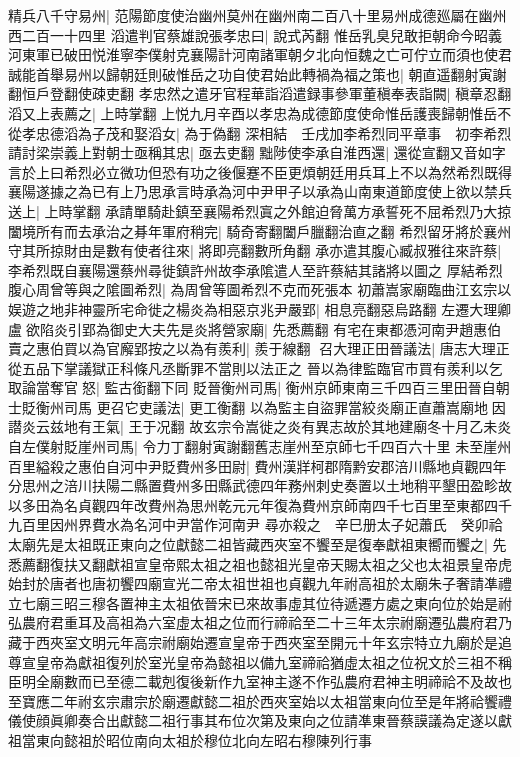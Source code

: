 精兵八千守易州|{
	范陽節度使治幽州莫州在幽州南二百八十里易州成德廵屬在幽州西二百一十四里}
滔遣判官蔡雄說張孝忠曰|{
	說式芮翻}
惟岳乳臭兒敢拒朝命今昭義河東軍已破田悦淮寧李僕射克襄陽計河南諸軍朝夕北向恒魏之亡可佇立而須也使君誠能首舉易州以歸朝廷則破惟岳之功自使君始此轉禍為福之策也|{
	朝直遥翻射寅謝翻恒戶登翻使疎吏翻}
孝忠然之遣牙官程華詣滔遣録事參軍董稹奉表詣闕|{
	稹章忍翻}
滔又上表薦之|{
	上時掌翻}
上悦九月辛酉以孝忠為成德節度使命惟岳護喪歸朝惟岳不從孝忠德滔為子茂和娶滔女|{
	為于偽翻}
深相結　壬戌加李希烈同平章事　初李希烈請討梁崇義上對朝士亟稱其忠|{
	亟去吏翻}
黜陟使李承自淮西還|{
	還從宣翻又音如字}
言於上曰希烈必立微功但恐有功之後偃蹇不臣更煩朝廷用兵耳上不以為然希烈既得襄陽遂據之為已有上乃思承言時承為河中尹甲子以承為山南東道節度使上欲以禁兵送上|{
	上時掌翻}
承請單騎赴鎮至襄陽希烈寘之外館迫脅萬方承誓死不屈希烈乃大掠闔境所有而去承治之朞年軍府稍完|{
	騎奇寄翻闔戶臘翻治直之翻}
希烈留牙將於襄州守其所掠財由是數有使者往來|{
	將即亮翻數所角翻}
承亦遣其腹心臧叔雅往來許蔡|{
	李希烈既自襄陽還蔡州尋徙鎮許州故李承隂遣人至許蔡結其諸將以圖之}
厚結希烈腹心周曾等與之隂圖希烈|{
	為周曾等圖希烈不克而死張本}
初蕭嵩家廟臨曲江玄宗以娱遊之地非神靈所宅命徙之楊炎為相惡京兆尹嚴郢|{
	相息亮翻惡烏路翻}
左遷大理卿盧欲陷炎引郢為御史大夫先是炎將營家廟|{
	先悉薦翻}
有宅在東都憑河南尹趙惠伯賣之惠伯買以為官廨郢按之以為有羨利|{
	羨于線翻}
召大理正田晉議法|{
	唐志大理正從五品下掌議獄正科條凡丞斷罪不當則以法正之}
晉以為律監臨官市買有羨利以乞取論當奪官怒|{
	監古銜翻下同}
貶晉衡州司馬|{
	衡州京師東南三千四百三里田晉自朝士貶衡州司馬}
更召它吏議法|{
	更工衡翻}
以為監主自盜罪當絞炎廟正直蕭嵩廟地因譛炎云兹地有王氣|{
	王于况翻}
故玄宗令嵩徙之炎有異志故於其地建廟冬十月乙未炎自左僕射貶崖州司馬|{
	令力丁翻射寅謝翻舊志崖州至京師七千四百六十里}
未至崖州百里縊殺之惠伯自河中尹貶費州多田尉|{
	費州漢牂柯郡隋黔安郡涪川縣地貞觀四年分思州之涪川扶陽二縣置費州多田縣武德四年務州刺史奏置以土地稍平墾田盈畛故以多田為名貞觀四年改費州為思州乾元元年復為費州京師南四千七百里至東都四千九百里因州界費水為名河中尹當作河南尹}
尋亦殺之　辛巳册太子妃蕭氏　癸卯祫太廟先是太祖既正東向之位獻懿二祖皆藏西夾室不饗至是復奉獻祖東嚮而饗之|{
	先悉薦翻復扶又翻獻祖宣皇帝熙太祖之祖也懿祖光皇帝天賜太祖之父也太祖景皇帝虎始封於唐者也唐初饗四廟宣光二帝太祖世祖也貞觀九年祔高祖於太廟朱子奢請凖禮立七廟三昭三穆各置神主太祖依晉宋已來故事虛其位待遞遷方處之東向位於始是祔弘農府君重耳及高祖為六室虛太祖之位而行禘祫至二十三年太宗祔廟遷弘農府君乃藏于西夾室文明元年高宗祔廟始遷宣皇帝于西夾室至開元十年玄宗特立九廟於是追尊宣皇帝為獻祖復列於室光皇帝為懿祖以備九室禘祫猶虛太祖之位祝文於三祖不稱臣明全廟數而已至德二載剋復後新作九室神主遂不作弘農府君神主明禘祫不及故也至寶應二年祔玄宗肅宗於廟遷獻懿二祖於西夾室始以太祖當東向位至是年將祫饗禮儀使顔眞卿奏合出獻懿二祖行事其布位次第及東向之位請凖東晉蔡謨議為定遂以獻祖當東向懿祖於昭位南向太祖於穆位北向左昭右穆陳列行事}

